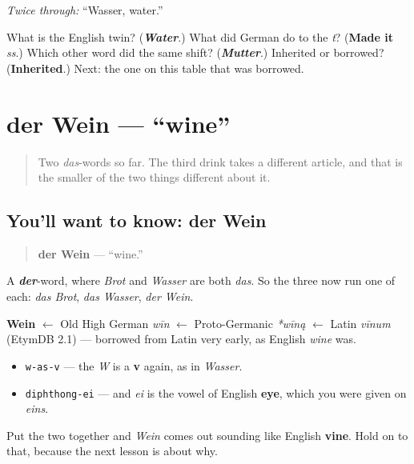 \emph{Twice through:} \textquotedblleft{}Wasser, water.\textquotedblright{}

\begin{tcolorbox}[breakable,colback=teal!4,colframe=teal!35!black,title={Before you move on}]
What is the English twin? (\emph{\textbf{Water}}.) What did German do to the \emph{t}? (\textbf{Made it} \emph{ss}.) Which other word did the same shift? (\emph{\textbf{Mutter}}.) Inherited or borrowed? (\textbf{Inherited}.) Next: the one on this table that was borrowed.
\end{tcolorbox}
\section[der Wein]{der Wein — \textquotedblleft{}wine\textquotedblright{}}

\label{lesson:GE-C11-wein}



\begin{quote}
Two \emph{das}-words so far. The third drink takes a different article, and that is the smaller of the two things different about it.
\end{quote}

\subsection*{You'll want to know: der Wein}
\begin{quote}
\textbf{der Wein} — \textquotedblleft{}wine.\textquotedblright{}
\end{quote}

A \emph{\textbf{der}}-word, where \emph{Brot} and \emph{Wasser} are both \emph{das}. So the three now run one of each: \emph{das Brot}, \emph{das Wasser}, \emph{der Wein}.

\begin{cousinweb}
\textbf{Wein} $\leftarrow$ Old High German \emph{wīn} $\leftarrow$ Proto-Germanic \emph{*wīną} $\leftarrow$ Latin \emph{vīnum} (EtymDB 2.1) — borrowed from Latin very early, as English \emph{wine} was.
\end{cousinweb}

\begin{sounds}
\begin{itemize}
\raggedright
  \item \texttt{w-as-v} — the \emph{W} is a \textbf{v} again, as in \emph{Wasser}.
  \item \texttt{diphthong-ei} — and \emph{ei} is the vowel of English \textbf{eye}, which you were given on \emph{eins}.
\end{itemize}

Put the two together and \emph{Wein} comes out sounding like English \textbf{vine}. Hold on to that, because the next lesson is about why.
\end{sounds}

